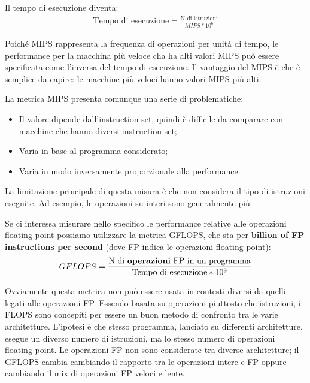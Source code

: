 Il tempo di esecuzione diventa:
\begin{align*}
    \text{Tempo di esecuzione} = \frac{\text{N di istruzioni}}{MIPS * 10^6}
\end{align*}

Poiché MIPS rappresenta la frequenza di operazioni per unità di tempo, le performance per la macchina più veloce cha ha alti valori MIPS può essere specificata come l'inversa del tempo di esecuzione. Il vantaggio del MIPS è che è semplice da capire: le macchine più veloci hanno valori MIPS più alti. 

La metrica MIPS presenta comunque una serie di problematiche:
\begin{itemize}
    \item Il valore dipende dall'instruction set, quindi è difficile da comparare con macchine che hanno diversi instruction set;
    \item Varia in base al programma considerato;
    \item Varia in modo inversamente proporzionale alla performance.
\end{itemize}

La limitazione principale di questa misura è che non considera il tipo di istruzioni eseguite. Ad esempio, le operazioni su interi sono generalmente più







Se ci interessa misurare nello specifico le performance relative alle operazioni floating-point possiamo utilizzare la metrica GFLOPS, che sta per \textbf{billion of FP instructions per second} (dove FP indica le operazioni floating-point):
\begin{align*}
    GFLOPS = \frac{\text{N di \textbf{operazioni} FP in un programma}}{\text{Tempo di esecuzione} * 10^9}
\end{align*}

Ovviamente questa metrica non può essere usata in contesti diversi da quelli legati alle operazioni FP. Essendo basata su operazioni piuttosto che istruzioni, i FLOPS sono concepiti per essere un buon metodo di confronto tra le varie architetture. L'ipotesi è che stesso programma, lanciato su differenti architetture, esegue un diverso numero di istruzioni, ma lo stesso numero di operazioni floating-point. Le operazioni FP non sono considerate tra diverse architetture; il GFLOPS cambia cambiando il rapporto tra le operazioni intere e FP oppure cambiando il mix di operazioni FP veloci e lente.

